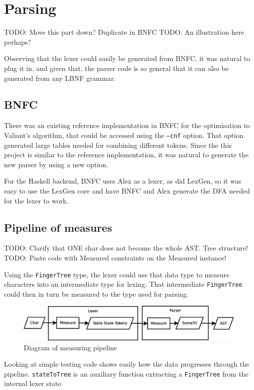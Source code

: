 \documentclass[a4paper,12pt,twosided]{report}
\begin{document}
\section{Parsing}
TODO: Move this part down? Duplicate in BNFC
TODO: An illustration here perhaps?

Observing that the lexer could easily be generated from BNFC, it was natural to
plug it in, and given that, the parser code is so general that it can also be
generated from any LBNF grammar.
\subsection{BNFC}
There was an existing reference implementation in BNFC for the optimisation to
Valiant's algorithm, that could be accessed using the \texttt{--cnf} option.
That option generated large tables needed for combining different tokens. Since
the this project is similar to the reference implementation, it was natural to
generate the new parser by using a new option.

For the Haskell backend, BNFC uses Alex as a lexer, as did LexGen, so it was
easy to use the LexGen core and have BNFC and Alex generate the DFA needed for
the lexer to work. 

\subsection{Pipeline of measures}
TODO: Clarify that ONE char does not become the whole AST. Tree structure!
TODO: Paste code with Measured constraints on the Measured instance!

Using the \texttt{FingerTree} type, the lexer could use that data type to
measure characters into an intermediate type for lexing. That intermediate
\texttt{FingerTree} could then in turn be measured to the type used for parsing.
\begin{figure}[H]
\includegraphics[width=\textwidth]{pipeline.eps}
\caption{Diagram of measuring pipeline}
\end{figure}
Looking at simple testing code shows easily how the data progresses through the
pipeline. \texttt{stateToTree} is an auxiliary function extracting a
\texttt{FingerTree} from the internal lexer state.
\end{document}
